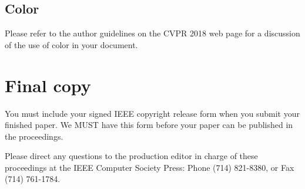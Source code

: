 \documentclass[10pt,twocolumn,letterpaper]{article}
\begin{document}
\subsection{Color}

Please refer to the author guidelines on the CVPR 2018 web page for a discussion
of the use of color in your document.

\section{Final copy}

You must include your signed IEEE copyright release form when you submit
your finished paper. We MUST have this form before your paper can be
published in the proceedings.

Please direct any questions to the production editor in charge of these
proceedings at the IEEE Computer Society Press: Phone (714) 821-8380, or
Fax (714) 761-1784.

{\small


}
\end{document}
